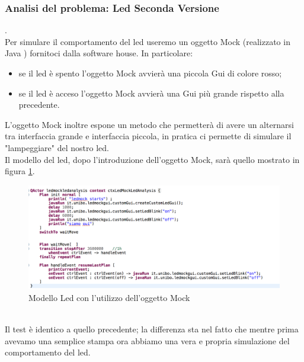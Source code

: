 \documentclass{llncs}
\newcommand{\java}{\textsf{Java }}
\begin{document}
\subsubsection{Analisi del problema: Led Seconda Versione} .
\label{AnalisidelproblemaReq4LedV2}
\vspace*{1ex}
\\
Per simulare il comportamento del led useremo un oggetto Mock (realizzato in \java) fornitoci dalla software house. In particolare:
\begin{itemize}
    \item se il led \`e spento l'oggetto Mock avvier\`a una piccola Gui di colore rosso;
    \item se il led \`e acceso l'oggetto Mock avvier\`a una Gui pi\`u grande rispetto alla precedente.
\end{itemize}
L'oggetto Mock inoltre espone un metodo che permetter\`a di avere un alternarsi tra interfaccia grande e interfaccia piccola, in pratica ci permette di simulare il "lampeggiare" del nostro led.\\
Il modello del led, dopo l'introduzione dell'oggetto Mock, sar\`a quello mostrato in figura \hyperref[fig:ledMockobj]{\ref{fig:ledMockobj}}.\\
\begin{figure}
    \centering
    \includegraphics[width=1\textwidth]{Immagini/Requisito4/LedMockReq4.png}
    \caption{Modello Led con l'utilizzo dell'oggetto Mock}
    \label{fig:ledMockobj}
\end{figure}
\vspace*{1ex}
\\
Il test \`e identico a quello precedente; la differenza sta nel fatto che mentre prima avevamo una semplice stampa ora abbiamo una vera e propria simulazione del comportamento del led.
\clearpage

\end{document}
